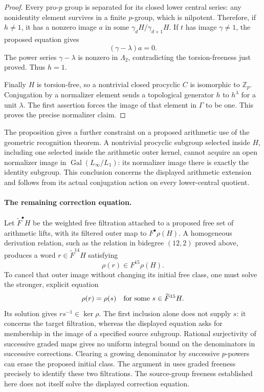 \begin{proof}
Every pro-\(p\) group is separated for its closed lower central
series: any nonidentity element survives in a finite \(p\)-group,
which is nilpotent.  Therefore, if \(h\neq1\), it has a nonzero
image \(a\) in some
\(\gamma_dH/\gamma_{d+1}H\).  If \(t\) has image
\(\gamma\neq1\), the proposed equation gives
\[
                         (\gamma-\lambda)a=0 .
\]
The power series \(\gamma-\lambda\) is nonzero in
\(\Lambda_2\), contradicting the torsion-freeness just proved.
Thus \(h=1\).

Finally \(H\) is torsion-free, so a nontrivial closed
procyclic \(C\) is isomorphic to \(\mathbb Z_p\).
Conjugation by a normalizer element sends a topological
generator \(h\) to \(h^\lambda\) for a unit \(\lambda\).
The first assertion forces the image of that element in
\(\Gamma\) to be one.  This proves the precise normalizer
claim.
\end{proof}

The proposition gives a further constraint on a proposed
arithmetic use of the geometric recognition theorem.  A
nontrivial procyclic subgroup selected inside \(H\), including
one selected inside the arithmetic outer kernel, cannot
acquire an open normalizer image in
\(\operatorname{Gal}(L_\infty/L_1)\): its normalizer image
there is exactly the identity subgroup.  This conclusion
concerns the displayed arithmetic extension and follows from
its actual conjugation action on every lower-central quotient.

\paragraph{The remaining correction equation.}
Let \(\widetilde F^\bullet H\) be the weighted free filtration
attached to a proposed free set of arithmetic lifts, with its
filtered outer map to \(F^\bullet\rho(H)\).
A homogeneous derivation relation, such as the relation in
bidegree \((12,2)\) proved above, produces a word
\(r\in\widetilde F^{14}H\) satisfying
\[
 \rho(r)\in F^{15}\rho(H).
\]
To cancel that outer image without changing its initial
free class, one must solve the stronger, explicit equation
\[
 \rho(r)=\rho(s)\quad\hbox{for some }s\in\widetilde F^{15}H.
\]
Its solution gives \(rs^{-1}\in\ker\rho\).
The first inclusion alone does not supply \(s\):
it concerns the target filtration, whereas the displayed equation
asks for membership in the image of a specified source subgroup.
Rational surjectivity of successive graded maps gives no
uniform integral bound on the denominators in successive
corrections.  Clearing a growing denominator by successive
\(p\)-powers can erase the proposed initial class.
The argument in \cite[proof of Theorem 2.14, p.~27]{Ishii} uses graded
freeness precisely to identify these two filtrations.
The source-group freeness established here does not itself
solve the displayed correction equation.
